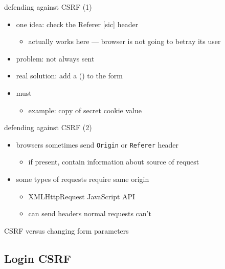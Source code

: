 \begin{frame}{defending against CSRF (1)}
    \begin{itemize}
        \item one idea: check the Referer [sic] header
            \begin{itemize}
            \item actually works here --- browser is not going to betray its user
            \end{itemize}
        \item problem: not always sent
        \vspace{.5cm}
        \item<2> real solution: add a  () to the form
        \item<2> must 
            \begin{itemize}
            \item example: copy of secret cookie value
            \end{itemize}
    \end{itemize}
\end{frame}

\begin{frame}{defending against CSRF (2)}
    \begin{itemize}
        \item browsers sometimes send \texttt{Origin} or \texttt{Referer} header
            \begin{itemize}
            \item if present, contain information about source of request
            \end{itemize}
        \item some types of requests require same origin
            \begin{itemize}
            \item XMLHttpRequest JavaScript API
            \item can send headers normal requests can't
            \end{itemize}
    \end{itemize}
\end{frame}

\begin{frame}{CSRF versus changing form parameters}
\end{frame}


\subsection{Login CSRF}

